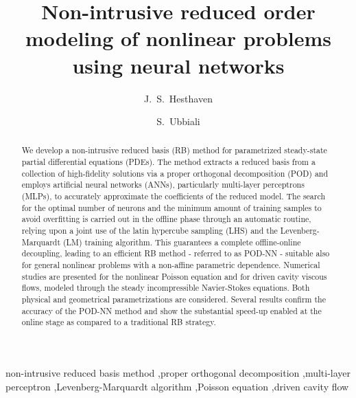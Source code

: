 \documentclass[longtitle]{elsarticle}
\numberwithin{equation}{section}
\theoremstyle{theorem}
\theoremstyle{definition}
\theoremstyle{remark}
\theoremstyle{proposition}
\numberwithin{figure}{section}
\begin{document}

	
	\begin{frontmatter}
		\title{Non-intrusive reduced order modeling of nonlinear problems \\ using neural networks}
		
		\author[epfl]{J.~S.~Hesthaven}
		
		\author[epfl,polimi]{S.~Ubbiali}
		
		\address[epfl]{\'Ecole Polytechnique F\'ed\'erale de Lausanne (EPFL), Route Cantonale, 1015 Lausanne, Switzerland}
		\address[polimi]{Politecnico di Milano, Piazza Leonardo da Vinci 32, 20133 Milan, Italy}
		
		\begin{abstract}
			We develop a non-intrusive reduced basis (RB) method for pa\-ra\-me\-tri\-zed steady-state partial differential equations (PDEs). The method extracts a reduced basis from a collection of high-fidelity solutions via a proper orthogonal decomposition (POD) and employs artificial neural networks (ANNs), particularly multi-layer perceptrons (MLPs), to accurately approximate the coefficients of the reduced model. The search for the optimal number of neurons and the minimum amount of training samples to avoid overfitting is carried out in the offline phase through an automatic routine, relying upon a joint use of the latin hypercube sampling (LHS) and the Levenberg-Marquardt (LM) training algorithm. This guarantees a complete offline-online decoupling, leading to an efficient RB method - referred to as POD-NN - suitable also for general nonlinear problems with a non-affine parametric dependence. Numerical studies are presented for the nonlinear Poisson equation and for driven cavity viscous flows, modeled through the steady incompressible Navier-Stokes equations. Both physical and geometrical parametrizations are considered. Several results confirm the accuracy of the POD-NN method and show the substantial speed-up enabled at the online stage as compared to a traditional RB strategy.		
		\end{abstract}
		
		\begin{keyword}
			non-intrusive reduced basis method \sep proper orthogonal decomposition \sep multi-layer perceptron \sep Levenberg-Marquardt algorithm \sep Poisson equation \sep driven cavity flow
		\end{keyword}
	\end{frontmatter}
	
\end{document}
